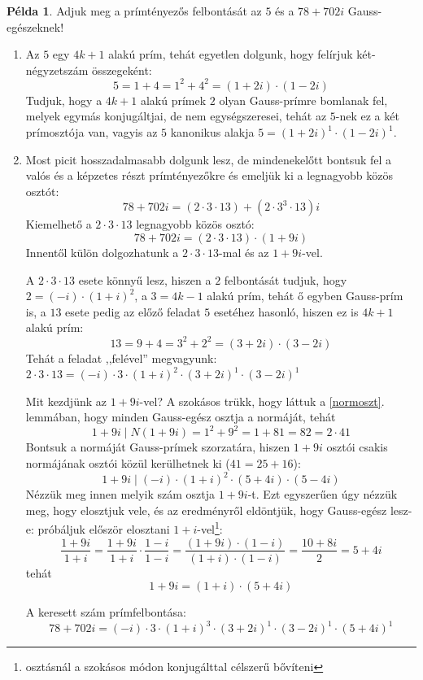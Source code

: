\documentclass[12pt]{book}
\theoremstyle{plain} %
\theoremstyle{definition} %
\newtheorem{pl}{Példa}[section]
\theoremstyle{remark}
\numberwithin{equation}{section}  %
\begin{document}
	\begin{pl}
		Adjuk meg a prímtényezős felbontását az $5$ és a $78+702 i$ Gauss-egészeknek!
		
		\begin{enumerate}[label = (\alph*)]
			\item{Az $5$ egy $4k+1$ alakú prím, tehát egyetlen dolgunk, hogy felírjuk két-négyzetszám összegeként:
			\[ 5 = 1+4 = 1^2+4^2 = (1+2i)\cdot (1-2i)  \]	
			Tudjuk, hogy a $4k+1$ alakú prímek $2$ olyan Gauss-prímre bomlanak fel, melyek egymás konjugáltjai, de nem egységszeresei, tehát az $5$-nek ez a két prímosztója van, vagyis az $5$ kanonikus alakja $5=(1+2i)^1\cdot (1-2i)^1$.
		}
		\item{Most picit hosszadalmasabb dolgunk lesz, de mindenekelőtt bontsuk fel a valós és a képzetes részt prímtényezőkre és emeljük ki a legnagyobb közös osztót:
		\[ 78+702 i = (2\cdot 3\cdot 13) + (2\cdot 3^3\cdot 13) i \]
		Kiemelhető a $2\cdot 3\cdot 13$ legnagyobb közös osztó:
		\[ 78 + 702 i = (2\cdot 3\cdot 13) \cdot (1+9i) \]
		Innentől külön dolgozhatunk a $2\cdot 3\cdot 13$-mal és az $1+9i$-vel.
		
		A $2\cdot 3\cdot 13$ esete könnyű lesz, hiszen a $2$ felbontását tudjuk, hogy $2=(-i)\cdot (1+i)^2$, a $3=4k-1$ alakú prím, tehát ő egyben Gauss-prím is, a $13$ esete pedig az előző feladat $5$ esetéhez hasonló, hiszen ez is $4k+1$ alakú prím:
		\[ 13 = 9+4 = 3^2+2^2 = (3+2i)\cdot (3-2i)  \]
		Tehát a feladat ,,felével'' megvagyunk: $2\cdot 3\cdot 13 = (-i)\cdot 3\cdot (1+i)^2\cdot (3+2i)^1\cdot (3-2i)^1$
		
		Mit kezdjünk az $1+9i$-vel? A szokásos trükk, hogy láttuk a \ref{normoszt}. lemmában, hogy minden Gauss-egész osztja a normáját, tehát
		\[ 1+9i \mid N(1+9i) = 1^2+9^2 = 1+81 = 82 = 2\cdot 41  \]
		Bontsuk a normáját Gauss-prímek szorzatára, hiszen $1+9i$ osztói csakis normájának osztói közül kerülhetnek ki ($41 = 25+16$):
		\[ 1+9i \mid (-i)\cdot (1+i)^2\cdot (5+4i)\cdot (5-4i)  \]
		Nézzük meg innen melyik szám osztja $1+9i$-t. Ezt egyszerűen úgy nézzük meg, hogy elosztjuk vele, és az eredményről eldöntjük, hogy Gauss-egész lesz-e: próbáljuk először elosztani $1+i$-vel\footnote{osztásnál a szokásos módon konjugálttal célszerű bővíteni}:
		\[ \dfrac{1+9i}{1+i} = \dfrac{1+9i}{1+i} \cdot \dfrac{1-i}{1-i} = \dfrac{(1+9i)\cdot(1-i)}{(1+i)\cdot (1-i)} = \dfrac{10+8i}{2} = 5+4i   \]
		tehát
		\[ 1+9i = (1+i)\cdot (5+4i)  \]
		
		A keresett szám prímfelbontása:
		\[ 78+702i = (-i)\cdot 3 \cdot (1+i)^3 \cdot (3+2i)^1\cdot (3-2i)^1\cdot (5+4i)^1  \]
		
		}
		\end{enumerate}
	\end{pl}
\end{document}
